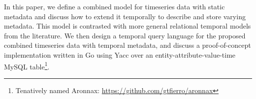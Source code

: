 In this paper, we define a combined model for timeseries data with static
metadata and discuss how to extend it temporally to describe and store varying
metadata. This model is contrasted with more general relational temporal models
from the literature. We then design a temporal query language for the proposed
combined timeseries data with temporal metadata, and discuss a proof-of-concept
implementation written in Go using Yacc over an entity-attribute-value-time MySQL
table\footnote{Tenatively named Aronnax: \url{https://github.com/gtfierro/aronnax}}.
